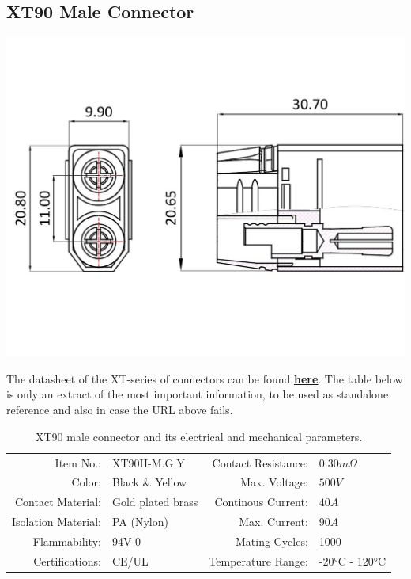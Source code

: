 \clearpage %

\subsection{XT90 Male Connector}

\includegraphics[width=\textwidth]{contents/figures/xt90_m.jpg}

The datasheet of the XT-series of connectors can be found \href{https://www.lcsc.com/datasheet/lcsc_datasheet_2207062115_Changzhou-Amass-Elec-XT90H-M-G-Y_C3040683.pdf}{\textbf{\underline{here}}}.
The table below is only an extract of the most important information, to be used as standalone reference and also in case the URL above fails.

\begin{table}[h] %
    \begin{tabular}{rlrl}
         Item No.:&  XT90H-M.G.Y &  Contact Resistance:& $0.30m \Omega$\\
         Color:&  Black \& Yellow&  Max. Voltage:& $500V$\\
         Contact Material:&  Gold plated brass&  Continous Current:& $40A$\\
         Isolation Material:&  PA (Nylon)&  Max. Current:& $90A$\\
         Flammability:&  94V-0&  Mating Cycles:& 1000\\
         Certifications:&  CE/UL&  Temperature Range:& -20°C - 120°C\\
    \end{tabular}
    \caption{XT90 male connector and its electrical and mechanical parameters.}
    \label{xt90_m_specs}
\end{table}

\clearpage %



